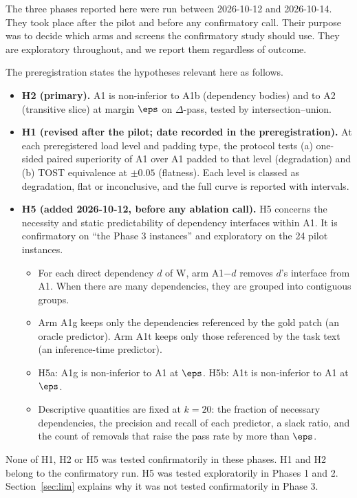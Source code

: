 The three phases reported here were run between 2026-10-12 and 2026-10-14. They took place after the pilot and before any confirmatory call. Their purpose was to decide which arms and screens the confirmatory study should use. They are exploratory throughout, and we report them regardless of outcome.

The preregistration states the hypotheses relevant here as follows.

\begin{itemize}
\item \textbf{H2 (primary).} A1 is non-inferior to A1b (dependency bodies) and to A2 (transitive slice) at margin $\eps$ on $\Delta$-pass, tested by intersection--union.
\item \textbf{H1 (revised after the pilot; date recorded in the preregistration).} At each preregistered load level and padding type, the protocol tests (a) one-sided paired superiority of A1 over A1 padded to that level (degradation) and (b) TOST equivalence at $\pm 0.05$ (flatness). Each level is classed as degradation, flat or inconclusive, and the full curve is reported with intervals.
\item \textbf{H5 (added 2026-10-12, before any ablation call).} H5 concerns the necessity and static predictability of dependency interfaces within A1. It is confirmatory on ``the Phase 3 instances'' and exploratory on the 24 pilot instances.
  \begin{itemize}
  \item For each direct dependency $d$ of W, arm A1$-d$ removes $d$'s interface from A1. When there are many dependencies, they are grouped into contiguous groups.
  \item Arm A1g keeps only the dependencies referenced by the gold patch (an oracle predictor). Arm A1t keeps only those referenced by the task text (an inference-time predictor).
  \item H5a: A1g is non-inferior to A1 at $\eps$. H5b: A1t is non-inferior to A1 at $\eps$.
  \item Descriptive quantities are fixed at $k=20$: the fraction of necessary dependencies, the precision and recall of each predictor, a slack ratio, and the count of removals that raise the pass rate by more than $\eps$.
  \end{itemize}
\end{itemize}

None of H1, H2 or H5 was tested confirmatorily in these phases. H1 and H2 belong to the confirmatory run. H5 was tested exploratorily in Phases 1 and 2. Section~\ref{sec:lim} explains why it was not tested confirmatorily in Phase 3.

